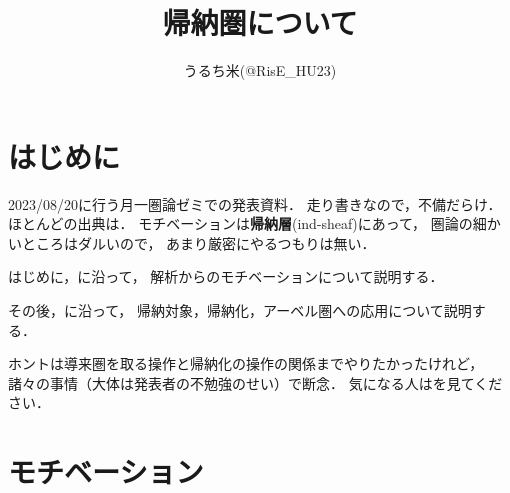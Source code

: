 





\def\inner<#1>{\langle #1 \rangle}
\def\ind<#1>{\mathop{\text{``}\hspace{-0.7pt}#1\limits\hspace{-1.5pt}\text{''}}}









\title{帰納圏について}
\author{うるち米(@RisE\_HU23)}
\date{}

\maketitle

\section*{はじめに}
2023/08/20に行う月一圏論ゼミでの発表資料．
走り書きなので，不備だらけ．
ほとんどの出典は\cite{KS01,KS06}．
モチベーションは\textbf{帰納層}(ind-sheaf)にあって，
圏論の細かいところはダルいので，
あまり厳密にやるつもりは無い．

はじめに，\cite{KS99,KS01}に沿って，
解析からのモチベーションについて説明する．

その後，\cite{KS01,KS06}に沿って，
帰納対象，帰納化，アーベル圏への応用について説明する．

ホントは導来圏を取る操作と帰納化の操作の関係までやりたかったけれど，
諸々の事情（大体は発表者の不勉強のせい）で断念．
気になる人は\cite{KS06}を見てください．

\section{モチベーション}

